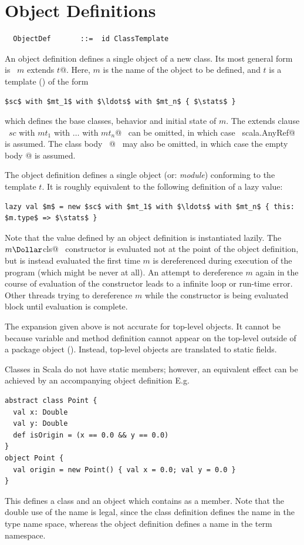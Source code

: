 \section{Object Definitions}
\label{sec:object-defs}
\label{def:companion}

\syntax\begin{lstlisting}
  ObjectDef       ::=  id ClassTemplate
\end{lstlisting}

An object definition defines a single object of a new class. Its 
most general form is
~\lstinline@object $m$ extends $t$@. Here,
$m$ is the name of the object to be defined, and 
$t$ is a template () of the form
\begin{lstlisting}
$sc$ with $mt_1$ with $\ldots$ with $mt_n$ { $\stats$ }
\end{lstlisting}
which defines the base classes, behavior and initial state of $m$.
The extends clause ~\lstinline@extends $sc$ with $mt_1$ with $\ldots$ with $mt_n$@~ 
can be omitted, in which case
~\lstinline@extends scala.AnyRef@~ is assumed.  The class body
~\lstinline@{$\stats\,$}@~ may also be omitted, in which case the empty body
\lstinline@{}@ is assumed.

The object definition defines a single object (or: {\em module})
conforming to the template $t$.  It is roughly equivalent to the
following definition of a lazy value:
\begin{lstlisting}
lazy val $m$ = new $sc$ with $mt_1$ with $\ldots$ with $mt_n$ { this: $m.type$ => $\stats$ }
\end{lstlisting}
Note that the value defined by an object definition is instantiated
lazily.  The ~\lstinline@new $m\Dollar$cls@~ constructor is evaluated
not at the point of the object definition, but is instead evaluated
the first time $m$ is dereferenced during execution of the program
(which might be never at all). An attempt to dereference $m$ again in
the course of evaluation of the constructor leads to a infinite loop
or run-time error.  
Other threads trying to dereference $m$ while the
constructor is being evaluated block until evaluation is complete.

The expansion given above is not accurate for top-level objects. It
cannot be because variable and method definition cannot appear on the
top-level outside of a package object ().  Instead,
top-level objects are translated to static fields.

\example
Classes in Scala do not have static members; however, an equivalent
effect can be achieved by an accompanying object definition
E.g.
\begin{lstlisting}
abstract class Point {
  val x: Double 
  val y: Double 
  def isOrigin = (x == 0.0 && y == 0.0) 
}
object Point {
  val origin = new Point() { val x = 0.0; val y = 0.0 }
}
\end{lstlisting}
This defines a class  and an object  which
contains  as a member.  Note that the double use of the
name  is legal, since the class definition defines the
name  in the type name space, whereas the object
definition defines a name in the term namespace. 

